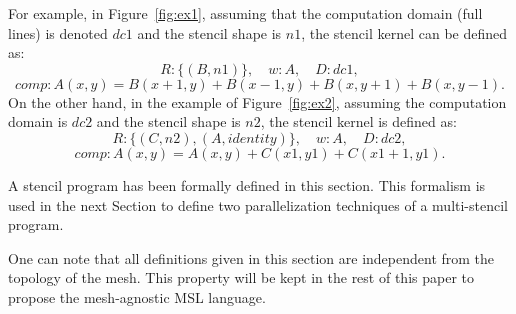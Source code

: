 For example, in Figure~\ref{fig:ex1}, assuming that the computation domain (full lines) is denoted $dc1$ and the stencil shape is $n1$, the stencil kernel can be defined as:
\begin{equation*}
R: \{(B,n1)\}, \quad w: A, \quad D: dc1,
\end{equation*}
\begin{equation*}
comp: A(x,y)=B(x+1,y)+B(x-1,y)+B(x,y+1)+B(x,y-1).
\end{equation*}
On the other hand, in the example of Figure~\ref{fig:ex2}, assuming the computation domain is $dc2$ and the stencil shape is $n2$, the stencil kernel is defined as:
\begin{equation*}
R: \{(C,n2),(A,identity)\}, \quad w: A, \quad D: dc2,
\end{equation*}
\begin{equation*}
comp: A(x,y)=A(x,y)+C(x1,y1)+C(x1+1,y1).
\end{equation*}

\medskip
A stencil program has been formally defined in this section. This formalism is used in the next Section to define two parallelization techniques of a multi-stencil program.

One can note that all definitions given in this section are independent from the topology of the mesh. This property will be kept in the rest of this paper to propose the mesh-agnostic MSL language.


